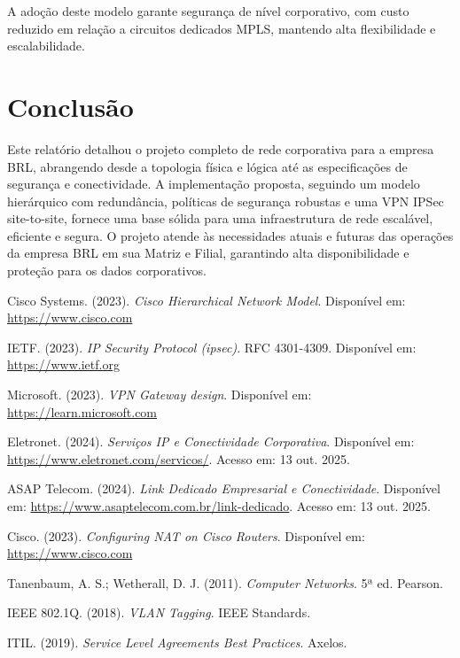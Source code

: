 \documentclass[a4paper, 12pt]{article}
\begin{document}
A adoção deste modelo garante segurança de nível corporativo, com custo reduzido em relação a circuitos dedicados MPLS, mantendo alta flexibilidade e escalabilidade.

\section{Conclusão}
\label{sec:conclusao}

Este relatório detalhou o projeto completo de rede corporativa para a empresa BRL, abrangendo desde a topologia física e lógica até as especificações de segurança e conectividade. A implementação proposta, seguindo um modelo hierárquico com redundância, políticas de segurança robustas e uma VPN IPSec site-to-site, fornece uma base sólida para uma infraestrutura de rede escalável, eficiente e segura. O projeto atende às necessidades atuais e futuras das operações da empresa BRL em sua Matriz e Filial, garantindo alta disponibilidade e proteção para os dados corporativos.

\begin{thebibliography}{9}

Cisco Systems. (2023). \emph{Cisco Hierarchical Network Model}.
Disponível em: \url{https://www.cisco.com}

IETF. (2023). \emph{IP Security Protocol (ipsec)}. RFC 4301-4309.
Disponível em: \url{https://www.ietf.org}

Microsoft. (2023). \emph{VPN Gateway design}.
Disponível em: \url{https://learn.microsoft.com}

Eletronet. (2024). \emph{Serviços IP e Conectividade Corporativa}.
Disponível em: \url{https://www.eletronet.com/servicos/}. Acesso em: 13 out. 2025.

ASAP Telecom. (2024). \emph{Link Dedicado Empresarial e Conectividade}.
Disponível em: \url{https://www.asaptelecom.com.br/link-dedicado}. Acesso em: 13 out. 2025.

Cisco. (2023). \emph{Configuring NAT on Cisco Routers}.
Disponível em: \url{https://www.cisco.com}

Tanenbaum, A. S.; Wetherall, D. J. (2011). \emph{Computer Networks}. 5ª ed. Pearson.

IEEE 802.1Q. (2018). \emph{VLAN Tagging}. IEEE Standards.

ITIL. (2019). \emph{Service Level Agreements Best Practices}. Axelos.

\end{thebibliography}
\end{document}
